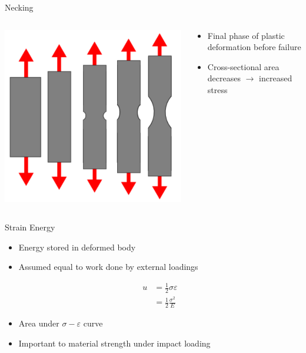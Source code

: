 \documentclass[10pt, svgnames]{beamer}
\begin{document}
\begin{frame}[label={sec:org2c8a083}]{Necking}
\begin{columns}
\begin{column}{0.5\columnwidth}
\begin{center}
\includegraphics[width=.9\linewidth]{pictures/necking.png}
\end{center}
\end{column}

\begin{column}{0.5\columnwidth}
\begin{itemize}
\item Final phase of plastic deformation before failure

\item Cross-sectional area decreases \(\rightarrow\) increased stress
\end{itemize}
\end{column}
\end{columns}
\end{frame}

\begin{frame}[label={sec:org7996e8d}]{Strain Energy}
\begin{itemize}
\item Energy stored in deformed body

\item Assumed equal to work done by external loadings

\begin{align*}
  u &= \frac{1}{2}\sigma\varepsilon \\
    &= \frac{1}{2}\frac{\sigma^2}{E}
\end{align*}

\item Area under \(\sigma-\varepsilon\) curve

\item Important to material strength under impact loading
\end{itemize}
\end{frame}
\end{document}
